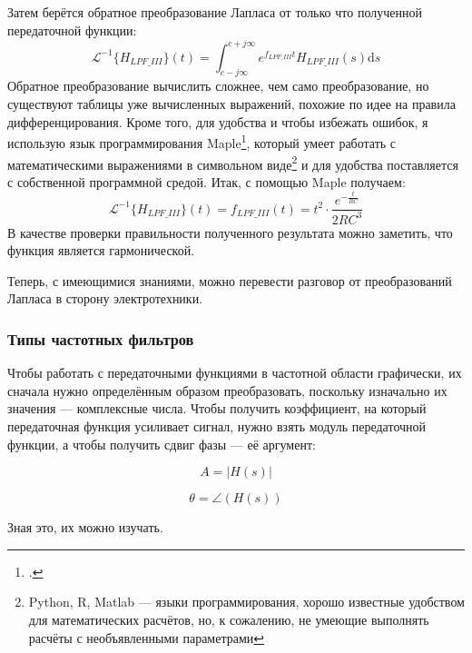 \documentclass[a4paper, 10pt, final]{article} %
\begin{document}
    \noindent Затем берётся обратное преобразование Лапласа от только что полученной передаточной функции:
    \begin{equation*}
        \mathcal{L}^{-1}\{H_{LPF\_III}\}(t) = \int_{c-j\infty}^{c+j\infty} e^{f_{LPF\_III}t} H_{LPF\_III}(s) \mathrm{d}s
    \end{equation*}
    \noindent Обратное преобразование вычислить сложнее, чем само преобразование, но существуют таблицы уже вычисленных выражений, похожие по идее на правила дифференцирования.
    Кроме того, для удобства и чтобы избежать ошибок, я использую язык программирования Maple\footcite[]{Maplesoft:Software}, который умеет работать с математическими выражениями в символьном виде\footnote{Python, R, Matlab --- языки программирования, хорошо известные удобством для математических расчётов, но, к сожалению, не умеющие выполнять расчёты с необъявленными параметрами} и для удобства поставляется с собственной программной средой.
    Итак, с помощью Maple получаем:
    \begin{equation*}
        \mathcal{L}^{-1}\{H_{LPF\_III}\}(t) = f_{LPF\_III}(t) = t^2 \cdot \frac{e^{-\frac{t}{RC}}}{2RC^3}
    \end{equation*}
    В качестве проверки правильности полученного результата можно заметить, что функция является гармонической.

    Теперь, с имеющимися знаниями, можно перевести разговор от преобразований Лапласа в сторону электротехники.

    \subsubsection{Типы частотных фильтров}
    Чтобы работать с передаточными функциями в частотной области графически, их сначала нужно определённым образом преобразовать, поскольку изначально их значения --- комплексные числа.
    Чтобы получить коэффициент, на который передаточная функция усиливает сигнал, нужно взять модуль передаточной функции, а чтобы получить сдвиг фазы --- её аргумент:
    \begin{figure}[H]
        \centering
        \begin{minipage}[b]{.31\linewidth}
            \centering
            \begin{equation*}
                A = \left|H(s)\right|
            \end{equation*}
        \end{minipage}
        \hspace{0.04\linewidth}
        \begin{minipage}[b]{.31\linewidth}
            \centering
            \begin{equation*}
                \theta = \angle\left(H(s)\right)
            \end{equation*}
        \end{minipage}
    \end{figure}
    \noindent Зная это, их можно изучать.
\end{document}

